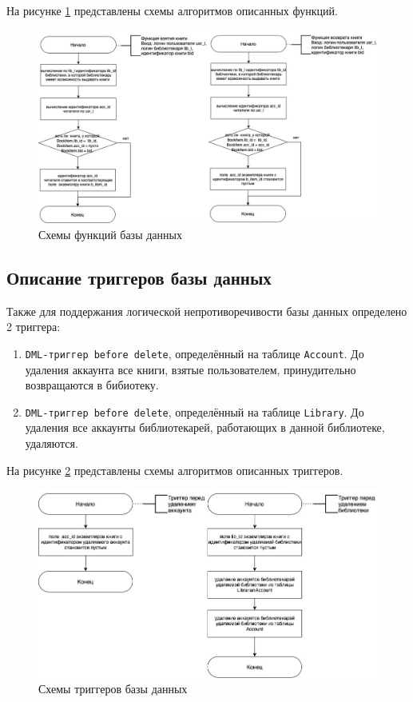 На рисунке \ref{fig:funcs} представлены схемы алгоритмов описанных функций.

\begin{figure}[H]
	\centering
	\includegraphics[width = \linewidth]{img/funcs_triggers-funcs.jpg}
	\caption{Схемы функций базы данных}
	\label{fig:funcs}
\end{figure}

\subsection{Описание триггеров базы данных}

Также для поддержания логической непротиворечивости базы данных определено 2 триггера:
\begin{enumerate}
    \item \texttt{DML-триггер before delete}, определённый на таблице \texttt{Account}. До \\удаления аккаунта все книги, взятые пользователем, принудительно возвращаются в бибиотеку.
    \item \texttt{DML-триггер before delete}, определённый на таблице \texttt{Library}. До \\удаления все аккаунты библиотекарей, работающих в данной библиотеке, удаляются.
\end{enumerate}

На рисунке \ref{fig:triggers} представлены схемы алгоритмов описанных триггеров.

\begin{figure}[H]
	\centering
	\includegraphics[width = \linewidth]{img/funcs_triggers-triggers.jpg}
	\caption{Схемы триггеров базы данных}
	\label{fig:triggers}
\end{figure}
\newpage
